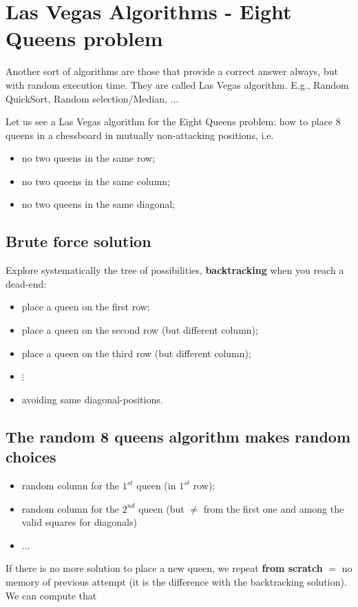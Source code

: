 \section{Las Vegas Algorithms - Eight Queens problem}
Another sort of algorithms are those that provide a correct answer always, but with random execution time. They are called Las Vegas algorithm. E.g., Random QuickSort, Random selection/Median, ...

Let us see a Las Vegas algorithm for the Eight Queens problem: how to place 8 queens in a chessboard in mutually non-attacking positions, i.e.
\begin{itemize}
	\item no two queens in the same row;
	\item no two queens in the same column;
	\item no two queens in the same diagonal;
\end{itemize}

\subsection{Brute force solution}
Explore systematically the tree of possibilities, \textbf{backtracking} when you reach a dead-end:
\begin{itemize}
	\item place a queen on the first row;
	\item place a queen on the second row (but different column);
	\item place a queen on the third row (but different column);
	\item $\vdots$
	\item avoiding same diagonal-positions.
\end{itemize}
\subsection{The random 8 queens algorithm makes random choices}
\begin{itemize}
	\item random column for the $1^{st}$ queen (in $1^{st}$ row);
	\item random column for the $2^{nd}$ queen (but $\neq$ from the first one and among the valid squares for diagonals)
	\item ...
\end{itemize}
If there is no more solution to place a new queen, we repeat \textbf{from scratch} $=$ no memory of previous attempt (it is the difference with the backtracking solution). We can compute that 

